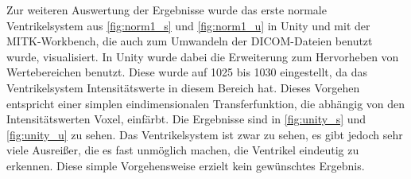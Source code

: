 

Zur weiteren Auswertung der Ergebnisse wurde das erste normale Ventrikelsystem aus \autoref{fig:norm1_s} und \autoref{fig:norm1_u} in Unity und mit der MITK-Workbench, die auch zum Umwandeln der DICOM-Dateien benutzt wurde, visualisiert.
\newline
In Unity wurde dabei die Erweiterung zum Hervorheben von Wertebereichen benutzt. Diese wurde auf 1025 bis 1030 eingestellt, da das Ventrikelsystem Intensitätswerte in diesem Bereich hat. Dieses Vorgehen entspricht einer simplen eindimensionalen Transferfunktion, die abhängig von den Intensitätswerten Voxel, einfärbt.
Die Ergebnisse sind in \autoref{fig:unity_s} und \autoref{fig:unity_u} zu sehen. Das Ventrikelsystem ist zwar zu sehen, es gibt jedoch sehr viele Ausreißer, die es fast unmöglich machen, die Ventrikel eindeutig zu erkennen. Diese simple Vorgehensweise erzielt kein gewünschtes Ergebnis.


